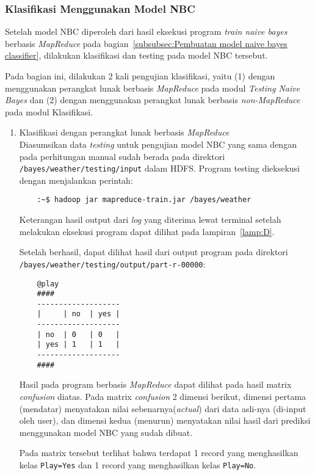 \subsubsection{Klasifikasi Menggunakan Model NBC}
Setelah model NBC diperoleh dari hasil eksekusi program \textit{train naive bayes} berbasis \textit{MapReduce} pada bagian~\ref{subsubsec:Pembuatan model naive bayes classifier}, dilakukan klasifikasi dan testing pada model NBC tersebut.

Pada bagian ini, dilakukan 2 kali pengujian klasifikasi, yaitu (1) dengan menggunakan perangkat lunak berbasis \textit{MapReduce} pada modul \textit{Testing Naive Bayes} dan (2) dengan menggunakan perangkat lunak berbasis \textit{non-MapReduce} pada modul Klasifikasi.
\begin{enumerate}
	\item{Klasifikasi dengan perangkat lunak berbasis \textit{MapReduce}}\\
	Diasumsikan data \textit{testing} untuk pengujian model NBC yang sama dengan pada perhitungan manual sudah berada pada direktori \texttt{/bayes/weather/testing/input} dalam HDFS. Program testing dieksekusi dengan menjalankan perintah:
	\begin{lstlisting}
	:~$ hadoop jar mapreduce-train.jar /bayes/weather
	\end{lstlisting}
	
	Keterangan hasil output dari \textit{log} yang diterima lewat terminal setelah melakukan eksekusi program dapat dilihat pada lampiran~\ref{lamp:D}.
	
	Setelah berhasil, dapat dilihat hasil dari output program pada direktori\\ \texttt{/bayes/weather/testing/output/part-r-00000}:
	\begin{lstlisting}
	@play
	####
	-------------------
	|     | no  | yes |
	-------------------
	| no  | 0   | 0   |
	| yes | 1   | 1   |
	-------------------
	####
	\end{lstlisting}
	Hasil pada program berbasis \textit{MapReduce} dapat dilihat pada hasil matrix \textit{confusion} diatas. Pada matrix \textit{confusion} 2 dimensi berikut, dimensi pertama (mendatar) menyatakan nilai sebenarnya(\textit{actual}) dari data asli-nya (di-input oleh user), dan dimensi kedua (menurun) menyatakan nilai hasil dari prediksi menggunakan model NBC yang sudah dibuat.
	
	Pada matrix tersebut terlihat bahwa terdapat 1 record yang menghasilkan kelas \texttt{Play=Yes} dan 1 record yang menghasilkan kelas \texttt{Play=No}.
	

\end{enumerate}
